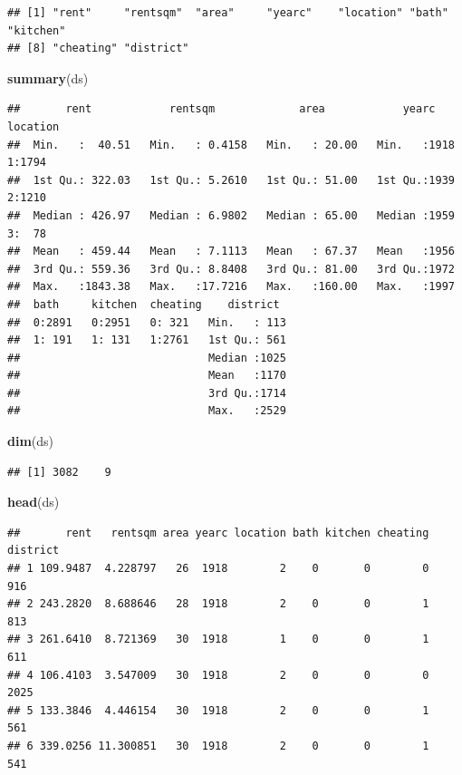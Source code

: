 \documentclass[
]{article}
\newenvironment{Shaded}{\begin{snugshade}}{\end{snugshade}}
\newcommand{\FunctionTok}[1]{\textcolor[rgb]{0.13,0.29,0.53}{\textbf{#1}}}
\newcommand{\NormalTok}[1]{#1}
\begin{document}
\begin{verbatim}
## [1] "rent"     "rentsqm"  "area"     "yearc"    "location" "bath"     "kitchen" 
## [8] "cheating" "district"
\end{verbatim}

\begin{Shaded}
\begin{Highlighting}[]
\FunctionTok{summary}\NormalTok{(ds)}
\end{Highlighting}
\end{Shaded}

\begin{verbatim}
##       rent            rentsqm             area            yearc      location
##  Min.   :  40.51   Min.   : 0.4158   Min.   : 20.00   Min.   :1918   1:1794  
##  1st Qu.: 322.03   1st Qu.: 5.2610   1st Qu.: 51.00   1st Qu.:1939   2:1210  
##  Median : 426.97   Median : 6.9802   Median : 65.00   Median :1959   3:  78  
##  Mean   : 459.44   Mean   : 7.1113   Mean   : 67.37   Mean   :1956           
##  3rd Qu.: 559.36   3rd Qu.: 8.8408   3rd Qu.: 81.00   3rd Qu.:1972           
##  Max.   :1843.38   Max.   :17.7216   Max.   :160.00   Max.   :1997           
##  bath     kitchen  cheating    district   
##  0:2891   0:2951   0: 321   Min.   : 113  
##  1: 191   1: 131   1:2761   1st Qu.: 561  
##                             Median :1025  
##                             Mean   :1170  
##                             3rd Qu.:1714  
##                             Max.   :2529
\end{verbatim}

\begin{Shaded}
\begin{Highlighting}[]
\FunctionTok{dim}\NormalTok{(ds)}
\end{Highlighting}
\end{Shaded}

\begin{verbatim}
## [1] 3082    9
\end{verbatim}

\begin{Shaded}
\begin{Highlighting}[]
\FunctionTok{head}\NormalTok{(ds)}
\end{Highlighting}
\end{Shaded}

\begin{verbatim}
##       rent   rentsqm area yearc location bath kitchen cheating district
## 1 109.9487  4.228797   26  1918        2    0       0        0      916
## 2 243.2820  8.688646   28  1918        2    0       0        1      813
## 3 261.6410  8.721369   30  1918        1    0       0        1      611
## 4 106.4103  3.547009   30  1918        2    0       0        0     2025
## 5 133.3846  4.446154   30  1918        2    0       0        1      561
## 6 339.0256 11.300851   30  1918        2    0       0        1      541
\end{verbatim}
\end{document}
